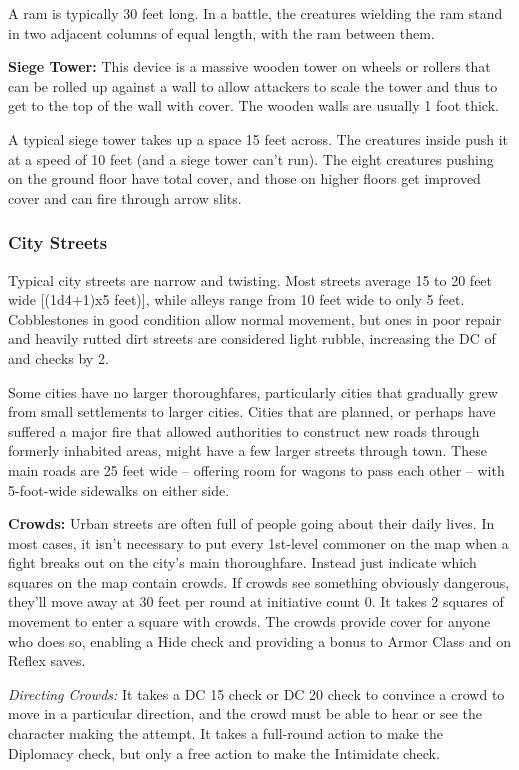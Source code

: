 A ram is typically 30 feet long. In a battle, the creatures wielding the ram stand 
in two adjacent columns of equal length, with the ram between them.

\textbf{Siege Tower:} This device is a massive wooden tower on wheels or rollers 
that can be rolled up against a wall to allow attackers to scale the tower and 
thus to get to the top of the wall with cover. The wooden walls are usually 1 foot 
thick.

A typical siege tower takes up a space 15 feet across. The creatures inside push 
it at a speed of 10 feet (and a siege tower can't run). The eight creatures pushing 
on the ground floor have total cover, and those on higher floors get improved cover 
and can fire through arrow slits.

\subsubsection{City Streets}

Typical city streets are narrow and twisting. Most streets average 15 to 20 feet 
wide [(1d4+1)x5 feet)], while alleys range from 10 feet wide 
to only 5 feet. Cobblestones in good condition allow normal movement, but ones 
in poor repair and heavily rutted dirt streets are considered light rubble, increasing 
the DC of  and  checks by 2.

Some cities have no larger thoroughfares, particularly cities that gradually grew 
from small settlements to larger cities. Cities that are planned, or perhaps have 
suffered a major fire that allowed authorities to construct new roads through formerly 
inhabited areas, might have a few larger streets through town. These main roads 
are 25 feet wide -- offering room for wagons to pass each other -- with 5-foot-wide 
sidewalks on either side.

\textbf{Crowds:} Urban streets are often full of people going about their daily 
lives. In most cases, it isn't necessary to put every 1st-level commoner on the 
map when a fight breaks out on the city's main thoroughfare. Instead just indicate 
which squares on the map contain crowds. If crowds see something obviously dangerous, 
they'll move away at 30 feet per round at initiative count 0. It takes 2 squares 
of movement to enter a square with crowds. The crowds provide cover for anyone 
who does so, enabling a Hide check and providing a bonus to Armor Class and on 
Reflex saves.

\textit{Directing Crowds:} It takes a DC 15  check or DC 20  
check to convince a crowd to move in a particular direction, and the crowd must 
be able to hear or see the character making the attempt. It takes a full-round 
action to make the Diplomacy check, but only a free action to make the Intimidate 
check.


